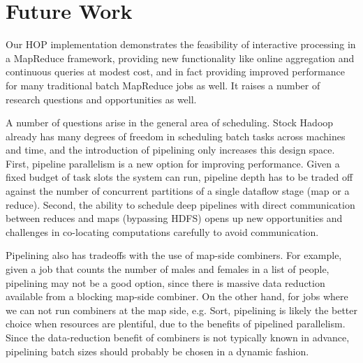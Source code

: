 \section{Future Work}
Our HOP implementation demonstrates the feasibility of interactive processing in a MapReduce framework, providing new functionality like online aggregation and continuous queries at modest cost, and in fact providing improved performance for many traditional batch MapReduce jobs as well.  It raises a number of research questions and opportunities as well.

A number of questions arise in the general area of scheduling.
Stock Hadoop already has many degrees of freedom in scheduling batch tasks across machines and time, and the introduction of pipelining only increases this design space.  First, pipeline parallelism is a new option for improving performance.  Given a fixed budget of task slots the system can run, pipeline depth has to be traded off against the number of concurrent partitions of a single dataflow stage (map or a reduce).  Second, the ability to schedule deep pipelines with direct communication between reduces and maps (bypassing HDFS) opens up new opportunities and challenges in co-locating computations carefully to avoid communication.

Pipelining also has tradeoffs with the use of map-side combiners.  For example, given a job that counts the number of males and females in a list of people, pipelining may not be a good option, since there is massive data reduction available from a blocking map-side combiner. On the other hand, for jobs where we can not run combiners at the map side, e.g. Sort, pipelining is likely the better choice when resources are plentiful, due to the benefits of pipelined parallelism.  Since the data-reduction benefit of combiners is not typically known in advance, pipelining batch sizes should probably be chosen in a dynamic fashion.


